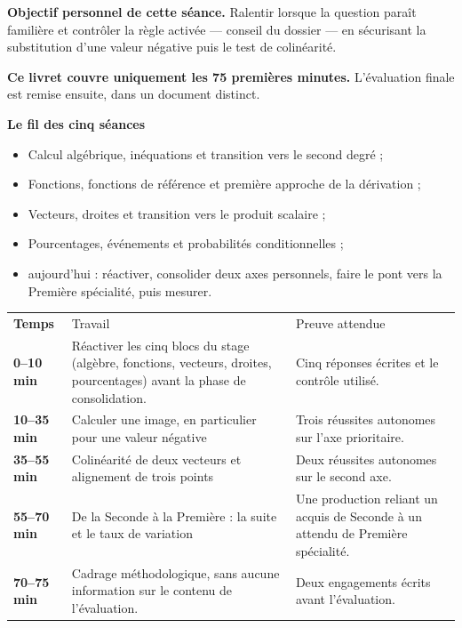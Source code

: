 \documentclass[10pt,a4paper]{article}
\begin{document}
\begin{goalbox}
\textbf{Objectif personnel de cette séance.} Ralentir lorsque la question paraît familière et contrôler la règle activée — conseil du dossier — en sécurisant la substitution d'une valeur négative puis le test de colinéarité.
\par\medskip
\textbf{Ce livret couvre uniquement les 75 premières minutes.} L'évaluation finale est remise ensuite, dans un document distinct.
\end{goalbox}
\begin{methodbox}
\textbf{Le fil des cinq séances}
\begin{itemize}[leftmargin=13mm,labelsep=3mm,itemsep=1.5pt]
\item[\textbf{\color{Navy}S1}] Calcul algébrique, inéquations et transition vers le second degré ;
\item[\textbf{\color{Navy}S2}] Fonctions, fonctions de référence et première approche de la dérivation ;
\item[\textbf{\color{Navy}S3}] Vecteurs, droites et transition vers le produit scalaire ;
\item[\textbf{\color{Navy}S4}] Pourcentages, événements et probabilités conditionnelles ;
\item[\textbf{\color{Navy}S5}] aujourd'hui : réactiver, consolider deux axes personnels, faire le pont vers la Première spécialité, puis mesurer.
\end{itemize}
\end{methodbox}
\par\noindent\begin{tabularx}{\linewidth}{>{\bfseries}p{20mm} X X}
\rowcolor{Navy}\color{white}Temps & \color{white}Travail & \color{white}Preuve attendue \\
0--10 min & Réactiver les cinq blocs du stage (algèbre, fonctions, vecteurs, droites, pourcentages) avant la phase de consolidation. & Cinq réponses écrites et le contrôle utilisé. \\
10--35 min & Calculer une image, en particulier pour une valeur négative & Trois réussites autonomes sur l'axe prioritaire. \\
35--55 min & Colinéarité de deux vecteurs et alignement de trois points & Deux réussites autonomes sur le second axe. \\
55--70 min & De la Seconde à la Première : la suite et le taux de variation & Une production reliant un acquis de Seconde à un attendu de Première spécialité. \\
70--75 min & Cadrage méthodologique, sans aucune information sur le contenu de l'évaluation. & Deux engagements écrits avant l'évaluation. \\
\end{tabularx}
\end{document}
